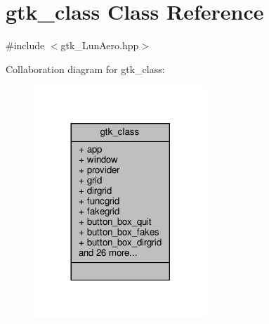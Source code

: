 \hypertarget{classgtk__class}{}\section{gtk\+\_\+class Class Reference}
\label{classgtk__class}


{\ttfamily \#include $<$gtk\+\_\+\+Lun\+Aero.\+hpp$>$}



Collaboration diagram for gtk\+\_\+class\+:\nopagebreak
\begin{figure}[H]
\begin{center}
\leavevmode
\includegraphics[width=185pt]{classgtk__class__coll__graph}
\end{center}
\end{figure}
